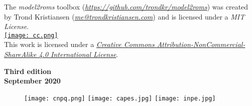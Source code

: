 \noindent The \textit{model2roms} toolbox (\textit{\textcolor{bleu_cite}{\href{https://github.com/trondkr/model2roms}{https://github.com/trondkr/model2roms}}}) was created by Trond 
          Kristiansen (\textit{\textcolor{bleu_cite}{\href{mailto:me@trondkristiansen.com}{me@trondkristiansen.com}}}) and is licensed under a \textit{MIT License}. 
\bigskip
\\

\noindent \href{http://creativecommons.org/licenses/by-nc-sa/4.0/}{\texttt{[image: cc.png]}}%
\\
\noindent This work is licensed under a \textit{\textcolor{bleu_cite}{\href{http://creativecommons.org/licenses/by-nc-sa/4.0/}{Creative Commons Attribution-NonCommercial-ShareAlike 4.0 International License}}}.

\bigskip
\begin{flushleft}
\noindent \textbf{Third edition} 
\\ 
\noindent \textbf{September 2020} 
\\
\end{flushleft}

\begin{figure}[H]
    \centering
    \vspace*{\fill}
    \texttt{[image: cnpq.png]}
    \hspace{3cm}
    \texttt{[image: capes.jpg]}
    \hspace{3cm}    
    \texttt{[image: inpe.jpg]}
\end{figure}
